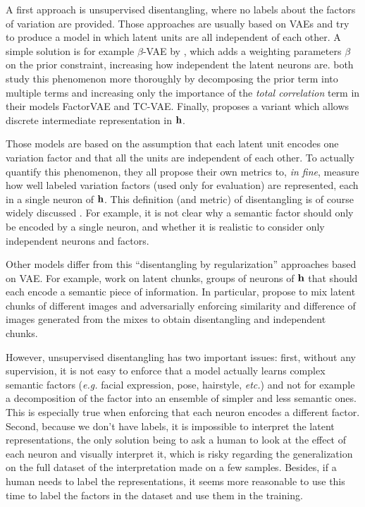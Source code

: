 A first approach is unsupervised disentangling, where no labels about the factors of variation are provided. Those approaches are usually based on \acp{VAE} and try to produce a model in which latent units are all independent of each other. A simple solution is for example $\beta$-\ac{VAE} by \citet{higgins2017beta}, which adds a weighting parameters $\beta$ on the prior constraint, increasing how independent the latent neurons are. \citet{chen2018isolating,kim2018disentangling} both study this phenomenon more thoroughly by decomposing the prior term into multiple terms and increasing only the importance of the \textit{total correlation} term in their models FactorVAE and TC-VAE. Finally, \citet{dupont2018learning} proposes a variant which allows discrete intermediate representation in $\mathbf{h}$.

Those models are based on the assumption that each latent unit encodes one variation factor and that all the units are independent of each other. To actually quantify this phenomenon, they all propose their own metrics to, \textit{in fine}, measure how well labeled variation factors (used only for evaluation) are represented, each in a single neuron of $\mathbf{h}$. This definition (and metric) of disentangling is of course widely discussed \citep{higgins2018towards}. For example, it is not clear why a semantic factor should only be encoded by a single neuron, and whether it is realistic to consider only independent neurons and factors.

Other models differ from this ``disentangling by regularization'' approaches based on \ac{VAE}. For example, \citet{Kulkarni2015,Hu2018} work on latent chunks, \ie groups of neurons of $\mathbf{h}$ that should each encode a semantic piece of information. In particular, \citet{Hu2018} propose to mix latent chunks of different images and adversarially enforcing similarity and difference of images generated from the mixes to obtain disentangling and independent chunks.

However, unsupervised disentangling has two important issues: first, without any supervision, it is not easy to enforce that a model actually learns complex semantic factors (\textit{e.g.} facial expression, pose, hairstyle, \textit{etc.}) and not for example a decomposition of the factor into an ensemble of simpler and less semantic ones. This is especially true when enforcing that each neuron encodes a different factor. Second, because we don't have labels, it is impossible to interpret the latent representations, the only solution being to ask a human to look at the effect of each neuron and visually interpret it, which is risky regarding the generalization on the full dataset of the interpretation made on a few samples. Besides, if a human needs to label the representations, it seems more reasonable to use this time to label the factors in the dataset and use them in the training.

